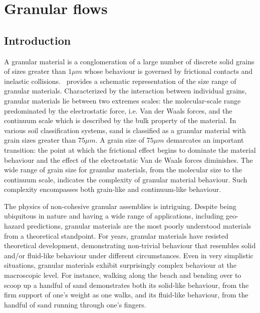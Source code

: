 \chapter{Granular flows}

\ifpdf
    \graphicspath{{Chapter2/figs/raster/}{Chapter2/figs/pdf/}{Chapter2/figs/}}
\else
    \graphicspath{{Chapter2/figs/vector/}{Chapter2/figs/}}
\fi

\section{Introduction}

A granular material is a conglomeration of a large number of discrete solid 
grains of sizes greater than $1\mu m$ whose behaviour is governed by 
frictional contacts and inelastic collisions.~ provides a 
schematic representation of the size range of granular materials. Characterized 
by the interaction between individual grains, granular materials lie between 
two extremes scales: the molecular-scale range predominated by 
the electrostatic force, i.e. Van der Waals forces, and the continuum scale 
which is described by the bulk property of the material. In various soil 
classification systems, sand is classified as a granular material with grain 
sizes greater than $75\mu m$. A grain size of $75\mu m$ demarcates an important 
transition: the point at which the frictional effect begins to dominate the 
material behaviour and the effect of the electrostatic Van de Waals forces 
diminishes. The wide range of grain size for granular materials, from the 
molecular size to the continuum scale, indicates the complexity of granular 
material behaviour. Such complexity encompasses both grain-like and 
continuum-like behaviour.

The physics of non-cohesive granular assemblies is 
intriguing. Despite being ubiquitous in nature and having a wide range of 
applications, including geo-hazard predictions, granular materials are the 
most poorly understood materials from a theoretical standpoint. For years, 
granular materials have resisted theoretical development, demonstrating 
non-trivial behaviour that resembles solid and/or fluid-like behaviour under 
different circumstances. Even in very simplistic situations, granular materials 
exhibit surprisingly complex behaviour at the macroscopic level. For instance, 
walking along the beach and bending over to scoop up a handful of sand 
demonstrates both its solid-like behaviour, from the firm support of one's 
weight as one walks, and its fluid-like behaviour, from the handful of sand 
running through one's fingers.

